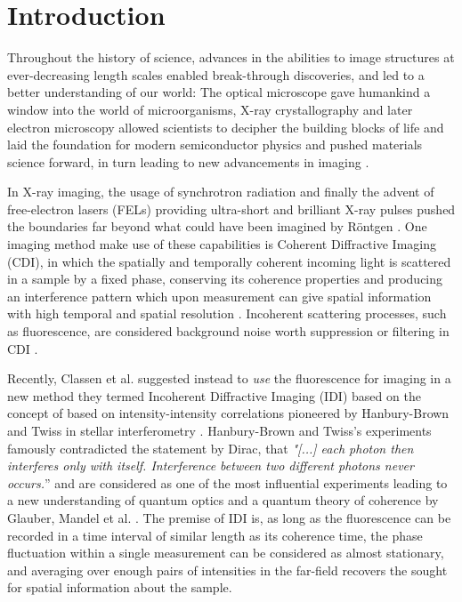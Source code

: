 \chapter{Introduction}
Throughout the history of science, advances in the abilities to image structures at ever-decreasing length scales enabled break-through discoveries, and led to a better understanding of our world:
The optical microscope gave humankind a window into the world of microorganisms, X-ray crystallography and later electron microscopy allowed scientists to decipher the building blocks of life and laid the foundation for modern semiconductor physics and pushed materials science forward, in turn leading to new advancements in imaging \cite{hooke1665,laue1915,ruska1939,watson1953,hovmoeller1984}.

In X-ray imaging, the usage of synchrotron radiation and finally the advent of free-electron lasers (FELs) providing ultra-short and brilliant X-ray pulses pushed the boundaries far beyond what could have been imagined by Röntgen \cite{cloetens1996,emma2010}. One imaging method make use of these capabilities is Coherent Diffractive Imaging (CDI), in which the spatially and temporally coherent incoming light is scattered in a sample by a fixed phase, conserving its coherence properties and producing an interference pattern which upon measurement can give spatial information with high temporal and spatial resolution \cite{seibert2011,bostedt2010,barke2015}. Incoherent scattering processes, such as fluorescence, are considered background noise worth suppression or filtering in CDI \cite{schultz2013chapter7}. 

Recently, Classen et al. suggested instead to \textit{use} the fluorescence for imaging in a new method they termed Incoherent Diffractive Imaging (IDI) \cite{classen2017} based on the concept of based on intensity-intensity correlations pioneered by Hanbury-Brown and Twiss in stellar interferometry \cite{hanbury1956}.  Hanbury-Brown and Twiss's experiments famously contradicted the statement by Dirac, that \textit{"[...] each photon then interferes only with itself. Interference between two different photons never occurs.}” \cite{dirac1958} and are considered as one of the most influential experiments leading to a new understanding of quantum optics and a quantum theory of coherence by Glauber, Mandel et al. \cite{glauber1963,mandel1959, hong1987,glauber2006}.  The premise of IDI is, as long as the fluorescence can be recorded in a time interval of similar length as its coherence time, the phase fluctuation within a single measurement can be considered as almost stationary, and averaging over enough pairs of intensities in the far-field recovers the sought for spatial information about the sample.

